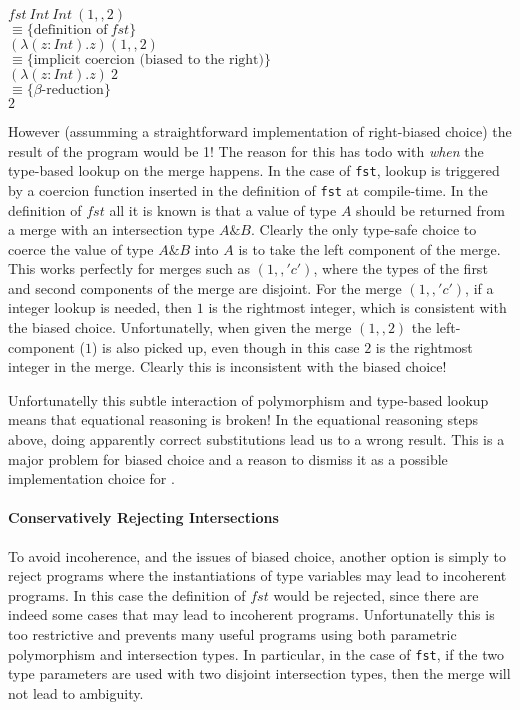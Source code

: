 \vspace{5pt}
\noindent$fst~Int~Int~(1,,2)$\\
$\equiv\{\text{definition of}~fst\}$\\
$(\lambda (z : Int). z) (1,,2)$\\
$\equiv\{\text{implicit coercion (biased to the right)}\}$\\
$(\lambda (z : Int). z)~2$\\
$\equiv\{\beta\text{-reduction}\}$\\
$2$
\vspace{5pt}

However (assumming a straightforward implementation of right-biased
choice) the result of the program would be 1! The reason for this has
todo with \emph{when} the type-based lookup on the merge happens. In
the case of \lstinline{fst}, lookup is triggered by a coercion
function inserted in the definition of \lstinline{fst} at
compile-time. 
In the definition of $fst$ all it is known is that a
value of type $A$ should be returned from a merge with an intersection
type $A\&B$.  Clearly the only type-safe choice to coerce the value of
type $A\&B$ into $A$ is to
take the left component of the merge. This works perfectly for merges
such as $(1,,'c')$, where the types of the first and second components
of the merge are disjoint. For the merge $(1,,'c')$, if a integer lookup 
is needed, then $1$ is the rightmost integer, which is consistent with the 
biased choice. Unfortunatelly, when given the merge $(1,,2)$ the 
left-component ($1$) is also picked up, even though in this case $2$
is the rightmost integer in the merge. Clearly this is inconsistent 
with the biased choice!

Unfortunatelly this subtle interaction of polymorphism and type-based lookup
 means that equational reasoning is broken!
In the equational reasoning steps above, doing apparently correct
substitutions lead us to a wrong result. This is a major problem for
biased choice and a reason to dismiss it as a possible implementation
choice for \name.

\paragraph{Conservatively Rejecting Intersections}
To avoid incoherence, and the issues of biased choice, another option 
is simply to reject programs where the
instantiations of type variables may lead to incoherent programs. 
In this case the definition of $fst$ would be rejected, since there
are indeed some cases that may lead to incoherent programs. 
Unfortunatelly this is too restrictive and prevents many useful
programs using both parametric polymorphism and intersection types.
In particular, in the case of \lstinline{fst}, if the two type
parameters are used with two disjoint intersection
types, then the merge will not lead to ambiguity. 

